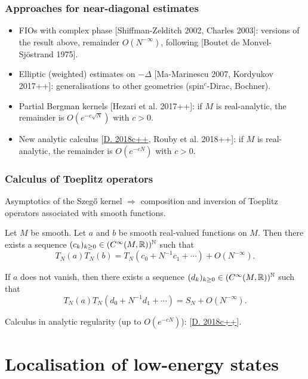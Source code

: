 \documentclass[mathserif]{beamer}
\newcommand{\mycite}[1]{{\color{mygreen} \small #1}}
\begin{document}
\begin{frame}
  \frametitle{Approaches for near-diagonal estimates}
    \begin{itemize}
    \item FIOs with complex phase \mycite{[Shiffman-Zelditch 2002,
        Charles 2003]}: versions of
      the result above, remainder $O(N^{-\infty})$, following
      \mycite{[Boutet de Monvel-Sjöstrand 1975]}.
    \item Elliptic (weighted) estimates on $-\Delta$
      \mycite{[Ma-Marinescu 2007, Kordyukov 2017++]}:
      generalisations to other geometries (spin$^c$-Dirac, Bochner).
    \item Partial Bergman kernels \mycite{[Hezari et al. 2017++]}: if $M$ is {\color{myorange}
        real-analytic}, the remainder is $O(e^{-c\sqrt{N}})$ with
      $c>0$.
    \item New analytic calculus \mycite{[\underline{D. 2018c++}, Rouby et al. 2018++]}: if $M$ is
      {\color{myorange} real-analytic},
      the remainder is $O(e^{-cN})$ with $c>0$.
    \end{itemize}
  \end{frame}

  \begin{frame}
    \frametitle{Calculus of Toeplitz operators}
    Asymptotics of the Szeg\H{o} kernel $\Rightarrow$ composition and
    inversion of Toeplitz operators associated with smooth
    functions.

    \begin{theorem}[{\mycite{[Charles 2003]}}]Let $M$ be smooth. Let $a$ and $b$ be
      smooth real-valued functions on $M$. Then there exists a sequence $(c_k)_{k\geq
        0}\in (C^{\infty}(M,\mathbb{R}))^{\mathbb{N}}$ such that
      \[
        T_N(a)T_N(b)=T_N(c_0+N^{-1}c_1+\cdots)+O(N^{-\infty}).
        \]

        If $a$ does not vanish, then there exists a sequence
        $(d_k)_{k\geq 0}\in (C^{\infty}(M,\mathbb{R}))^{\mathbb{N}}$ such that
        \[
          T_N(a)T_N(d_0+N^{-1}d_1+\cdots)=S_N+O(N^{-\infty}).
          \]
        \end{theorem}
        Calculus in analytic regularity (up to $O(e^{-cN})$):
        \mycite{[\underline{D. 2018c++}]}.
  \end{frame}


\section{Localisation of low-energy states}
\end{document}
